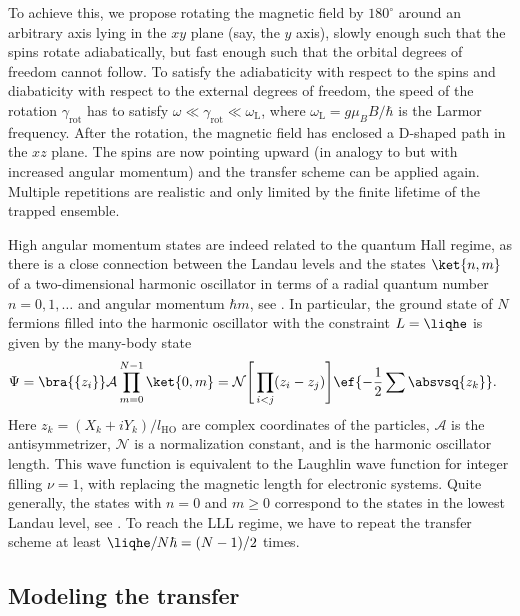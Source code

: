 To achieve this, we propose rotating the magnetic field by $180^\circ$ around an arbitrary axis lying in the $xy$ plane (say, the $y$ axis), slowly enough such that the spins rotate adiabatically, but fast enough such that the orbital degrees of freedom cannot follow. To satisfy the adiabaticity with respect to the spins and diabaticity with respect to the external degrees of freedom, the speed of the rotation $\gamma_\text{rot}$ has to satisfy
$\omega \ll \gamma_\text{rot} \ll \omega_\text{L}$, where $\omega_\text{L}=g\mu_B B/\hbar$ is the Larmor frequency. After the rotation, the magnetic field has enclosed a \textsf{D}-shaped path in the $xz$ plane. The spins are now pointing upward (in analogy to  but with
increased angular momentum) and the transfer scheme can be applied again. Multiple repetitions are realistic and only limited by the finite lifetime of the trapped ensemble.

High angular momentum states are indeed related to the quantum Hall regime, as there is a close connection between the Landau levels and the states $\ket{n,m}$ of a two-dimensional harmonic oscillator in terms of a radial quantum number $n=0,1,\dots$ and angular momentum $\hbar m$, see . In particular, the ground state of $N$ fermions filled into the harmonic oscillator with the constraint $L=\liqhe$ is given by the many-body state
\begin{align}
\Psi&= \bra{\{z_i\}}\mathcal{A} \prod_{m=0}^{N-1} \ket{0,m} = \mathcal{N}\Bigg[\prod_{i<j} (z_i-z_j) \Bigg] \ef{-\frac{1}{2}\sum\absvsq{z_k}}.
\end{align}
Here $z_k=(X_k+i Y_k)/l_\text{HO}$ are complex coordinates of the particles, $\mathcal{A}$ is the antisymmetrizer, $\mathcal{N}$ is a normalization constant, and  is the harmonic oscillator length. This wave function is equivalent to the Laughlin wave function for integer filling $\nu=1$, with    replacing the magnetic length  for electronic systems. Quite generally, the states with $n=0$ and $m\ge 0$ correspond to the states in the lowest Landau level, see .
To reach the LLL regime, we have to repeat the transfer scheme at least $\liqhe/N\hbar=(N-1)/2$ times.

\subsection{Modeling the transfer}

